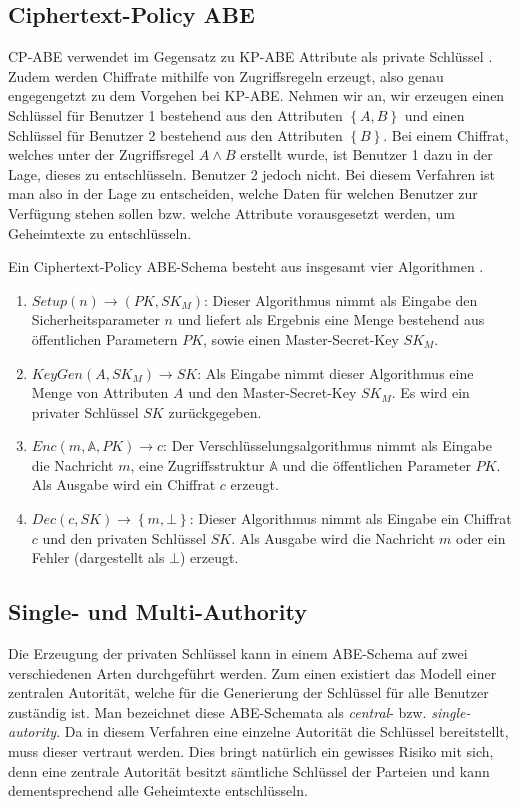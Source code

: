 \documentclass{hsflensburg}
\begin{document}
	\subsection{Ciphertext-Policy ABE}
	CP-ABE verwendet im Gegensatz zu KP-ABE Attribute als private Schlüssel
	\cite{cp-abe-ieee}. Zudem werden Chiffrate mithilfe von Zugriffsregeln
	erzeugt, also genau engegengetzt zu dem Vorgehen bei KP-ABE. Nehmen wir an,
	wir erzeugen einen Schlüssel für Benutzer 1 bestehend aus den Attributen
	$\left\{A, B\right\}$ und einen Schlüssel für Benutzer 2 bestehend aus den
	Attributen $\left\{B\right\}$. Bei einem Chiffrat, welches unter der
	Zugriffsregel $A \land B$ erstellt wurde, ist Benutzer 1 dazu in der Lage,
	dieses zu entschlüsseln.  Benutzer 2 jedoch nicht. Bei diesem Verfahren ist
	man also in der Lage zu entscheiden, welche Daten für welchen Benutzer zur
	Verfügung stehen sollen bzw. welche Attribute vorausgesetzt werden, um Geheimtexte
	zu entschlüsseln.

	Ein Ciphertext-Policy ABE-Schema besteht aus insgesamt vier Algorithmen
	\cite{cp-abe}.

	\begin{enumerate}
		\item $\textit{Setup}\left(n\right) \to \left(PK, SK_M\right)$: Dieser
			Algorithmus nimmt als Eingabe den Sicherheitsparameter $n$ und liefert als
			Ergebnis eine Menge bestehend aus öffentlichen Parametern $PK$, sowie
			einen Master-Secret-Key $SK_M$.
		\item $\textit{KeyGen}\left(A, SK_M\right) \to SK$: Als Eingabe
			nimmt dieser Algorithmus eine Menge von Attributen $A$ und den
			Master-Secret-Key $SK_M$. Es wird ein privater Schlüssel $SK$
			zurückgegeben.
		\item $Enc\left(m, \mathbb{A}, PK\right) \to c$: Der
			Verschlüsselungsalgorithmus nimmt als Eingabe die Nachricht $m$, eine
			Zugriffsstruktur $\mathbb{A}$ und die öffentlichen Parameter $PK$.  Als
			Ausgabe wird ein Chiffrat $c$ erzeugt.
		\item $Dec\left(c, SK\right) \to \left\{m, \bot\right\}$: Dieser Algorithmus
			nimmt als Eingabe ein Chiffrat $c$ und den privaten Schlüssel $SK$. Als
			Ausgabe wird die Nachricht $m$ oder ein Fehler (dargestellt als $\bot$)
			erzeugt.
	\end{enumerate}

	\subsection{Single- und Multi-Authority}
	Die Erzeugung der privaten Schlüssel kann in einem ABE-Schema auf zwei
	verschiedenen Arten durchgeführt werden. Zum einen existiert das Modell einer
	zentralen Autorität, welche für die Generierung der Schlüssel für alle
	Benutzer zuständig ist. Man bezeichnet diese ABE-Schemata als
	\textit{central}- bzw. \textit{single-autority}. Da in diesem Verfahren eine
	einzelne Autorität die Schlüssel bereitstellt, muss dieser vertraut werden.
	Dies bringt natürlich ein gewisses Risiko mit sich, denn eine zentrale
	Autorität besitzt sämtliche Schlüssel der Parteien und kann dementsprechend
	alle Geheimtexte entschlüsseln.
\end{document}
